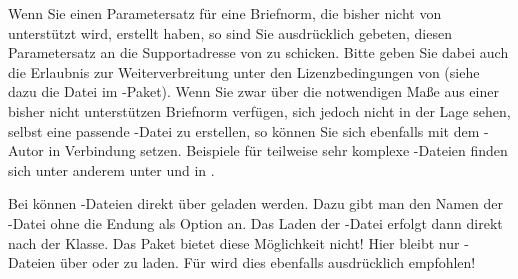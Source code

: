 Wenn Sie einen Parametersatz für eine Briefnorm, die bisher nicht von
\KOMAScript{} unterstützt wird, erstellt haben, so sind Sie ausdrücklich
gebeten, diesen Parametersatz an die Supportadresse von \KOMAScript{} zu
schicken. Bitte geben Sie dabei auch die Erlaubnis zur Weiterverbreitung unter
den Lizenzbedingungen von \KOMAScript{} (siehe dazu die Datei
\href{https://mirrors.ctan.org/macros/latex/contrib/koma-script/doc/lppl-de.txt}%
{} im \KOMAScript-Paket). Wenn Sie zwar über die notwendigen
Maße aus einer bisher nicht unterstützen Briefnorm verfügen, sich jedoch nicht
in der Lage sehen, selbst eine passende -Datei zu erstellen, so
können Sie sich ebenfalls mit dem \KOMAScript-Autor in Verbindung
setzen. Beispiele für teilweise sehr komplexe -Dateien finden sich
unter anderem unter \cite{homepage} und in \cite{DANTE:TK0203:MJK}.


\begin{Declaration}
\end{Declaration}
Bei  können -Dateien direkt
über  geladen werden. Dazu gibt man den
Namen der -Datei ohne die Endung als Option an. Das
Laden der -Datei erfolgt dann direkt nach der Klasse. Das Paket
 bietet diese Möglichkeit nicht! Hier
bleibt nur -Dateien über 
oder  zu
laden. Für  wird dies ebenfalls
ausdrücklich empfohlen!

